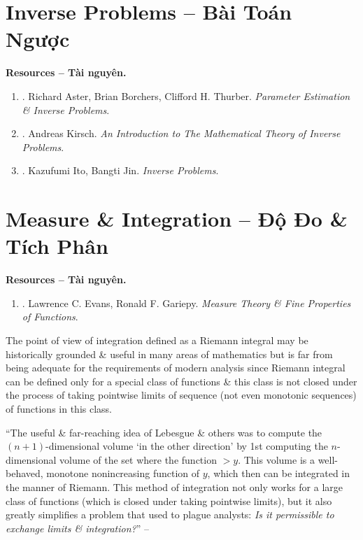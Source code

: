 \documentclass{article}
\begin{document}

\section{Inverse Problems -- Bài Toán Ngược}
\textbf{\textsf{Resources -- Tài nguyên.}}
\begin{enumerate}
	\item \cite{Aster_Borchers_Thurber2018}. {\sc Richard Aster, Brian Borchers, Clifford H. Thurber}. {\it Parameter Estimation \& Inverse Problems}.
	\item \cite{Kirsch2021}. {\sc Andreas Kirsch}. {\it An Introduction to The Mathematical Theory of Inverse Problems}.
	\item \cite{Ito_Jin2015}. {\sc Kazufumi Ito, Bangti Jin}. {\it Inverse Problems}.
\end{enumerate}


\section{Measure \& Integration -- Độ Đo \& Tích Phân}
\textbf{\textsf{Resources -- Tài nguyên.}}
\begin{enumerate}
	\item \cite{Evans_Gariepy2015}. {\sc Lawrence C. Evans, Ronald F. Gariepy}. {\it Measure Theory \& Fine Properties of Functions}.
\end{enumerate}
The point of view of integration defined as a Riemann integral may be historically grounded \& useful in many areas of mathematics but is far from being adequate for the requirements of modern analysis since Riemann integral can be defined only for a special class of functions \& this class is not closed under the process of taking pointwise limits of sequence (not even monotonic sequences) of functions in this class.

``The useful \& far-reaching idea of Lebesgue \& others was to compute the $(n + 1)$-dimensional volume `in the other direction' by 1st computing the $n$-dimensional volume of the set where the function $> y$. This volume is a well-behaved, monotone nonincreasing function of $y$, which then can be integrated in the manner of Riemann. This method of integration not only works for a large class of functions (which is closed under taking pointwise limits), but it also greatly simplifies a problem that used to plague analysts: {\it Is it permissible to exchange limits \& integration?}'' -- \cite[Chap. 1, pp. 1--2]{Lieb_Loss2001}
\end{document}
